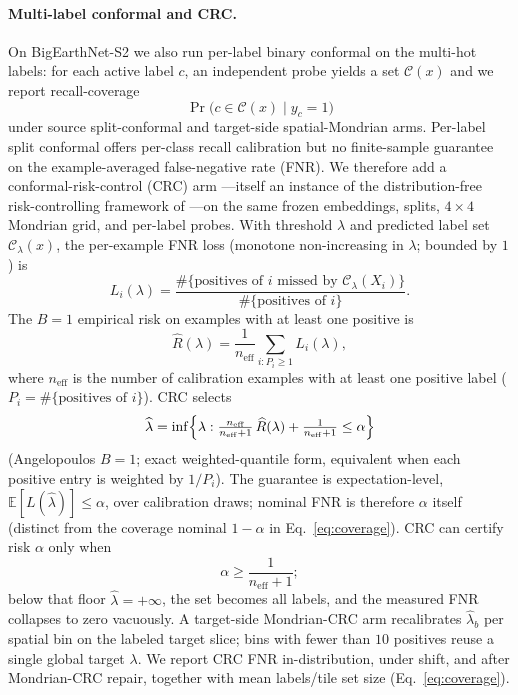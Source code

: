 \documentclass[preprint,11pt,authoryear]{elsarticle}
\begin{document}
\paragraph{Multi-label conformal and CRC.}
On BigEarthNet-S2 we also run per-label binary conformal on the multi-hot labels: for each active label
$c$, an independent probe yields a set $\mathcal{C}(x)$ and we report recall-coverage
\begin{equation}
\label{eq:recall-coverage}
\Pr\bigl(c\in\mathcal{C}(x)\mid y_c=1\bigr)
\end{equation}
under source split-conformal and target-side spatial-Mondrian arms. Per-label split conformal offers
per-class recall calibration but no finite-sample guarantee on the example-averaged false-negative rate
(FNR). We therefore add a conformal-risk-control (CRC) arm \citep{angelopoulos2024crc}---itself an instance
of the distribution-free risk-controlling framework of \citet{bates2021distributionfree}---on the same
frozen embeddings, splits, $4{\times}4$ Mondrian grid, and per-label probes. With threshold $\lambda$
and predicted label set $\mathcal{C}_\lambda(x)$, the per-example FNR loss (monotone non-increasing in
$\lambda$; bounded by $1$) is
\begin{equation}
\label{eq:fnr-loss}
L_i(\lambda)
=\frac{\#\{\text{positives of }i\text{ missed by }\mathcal{C}_\lambda(X_i)\}}
{\#\{\text{positives of }i\}}.
\end{equation}
The $B{=}1$ empirical risk on examples with at least one positive is
\begin{equation}
\label{eq:crc-risk}
\widehat{R}(\lambda)
=\frac{1}{n_{\mathrm{eff}}}\sum_{i:P_i\ge 1}L_i(\lambda),
\end{equation}
where $n_{\mathrm{eff}}$ is the number of calibration examples with at least one positive label
($P_i=\#\{\text{positives of }i\}$). CRC selects
\begin{equation}
\label{eq:crc-lambda}
\widehat{\lambda}
=\inf\Bigl\{\lambda:
\tfrac{n_{\mathrm{eff}}}{n_{\mathrm{eff}}{+}1}\,\widehat{R}(\lambda)+\tfrac{1}{n_{\mathrm{eff}}{+}1}\le\alpha\Bigr\}
\end{equation}
(Angelopoulos $B{=}1$; exact weighted-quantile form, equivalent when each positive entry is weighted by
$1/P_i$). The guarantee is expectation-level, $\mathbb{E}[L(\widehat{\lambda})]\le\alpha$, over calibration draws;
nominal FNR is therefore $\alpha$ itself (distinct from the coverage nominal $1{-}\alpha$ in
Eq.~\eqref{eq:coverage}). CRC can certify risk $\alpha$ only when
\begin{equation}
\label{eq:crc-attain}
\alpha\ge\frac{1}{n_{\mathrm{eff}}{+}1};
\end{equation}
below that floor $\widehat{\lambda}=+\infty$, the set becomes all labels, and the measured FNR collapses to zero
vacuously. A target-side Mondrian-CRC arm recalibrates $\widehat{\lambda}_b$ per spatial bin on the labeled
target slice; bins with fewer than $10$ positives reuse a single global target $\lambda$. We report
CRC FNR in-distribution, under shift, and after Mondrian-CRC repair, together with mean labels/tile set
size (Eq.~\eqref{eq:coverage}).
\end{document}
